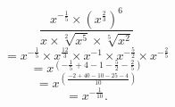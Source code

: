 \[
\frac{x^{-\frac{1}{5}}\times\left(x^{\frac{2}{3}}\right)^6}{x\times \sqrt[2]{x^5} \times \sqrt[5]{x^2}}
\]
\[
= x^{-\frac{1}{5}} \times x^{\frac{12}{3}} \times x^{-1} \times x^{-\frac{5}{2}} \times  x^{-\frac{2}{5}}
\]
\[
= x^{\left(-\frac{1}{5} + 4 -1 -\frac{5}{2} -\frac{2}{5}\right)}
\]
\[
=x^{\left(\frac{-2+40-10-25-4}{10}\right)}
\]
\[
= x^{-\frac{1}{10}}.
\]
